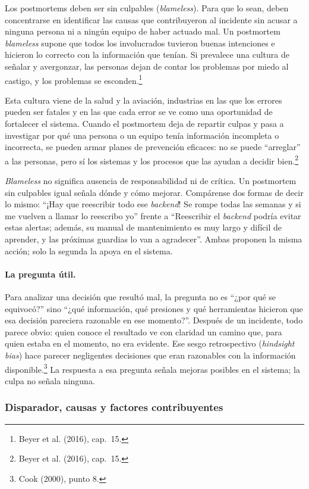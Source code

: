 \documentclass[variant=apuntes,cover=institutional,mode=screen]{ua-engineering-v6-article}
\begin{document}
Los postmortems deben ser sin culpables (\emph{blameless}). Para que lo sean, deben concentrarse en identificar las causas que contribuyeron al incidente sin acusar a ninguna persona ni a ningún equipo de haber actuado mal. Un postmortem \emph{blameless} supone que todos los involucrados tuvieron buenas intenciones e hicieron lo correcto con la información que tenían. Si prevalece una cultura de señalar y avergonzar, las personas dejan de contar los problemas por miedo al castigo, y los problemas se esconden.\footnote{Beyer et al. (2016), cap.~15.}

Esta cultura viene de la salud y la aviación, industrias en las que los errores pueden ser fatales y en las que cada error se ve como una oportunidad de fortalecer el sistema. Cuando el postmortem deja de repartir culpas y pasa a investigar por qué una persona o un equipo tenía información incompleta o incorrecta, se pueden armar planes de prevención eficaces: no se puede ``arreglar'' a las personas, pero sí los sistemas y los procesos que las ayudan a decidir bien.\footnote{Beyer et al. (2016), cap.~15.}

\emph{Blameless} no significa ausencia de responsabilidad ni de crítica. Un postmortem sin culpables igual señala dónde y cómo mejorar. Compárense dos formas de decir lo mismo: ``¡Hay que reescribir todo ese \emph{backend}! Se rompe todas las semanas y si me vuelven a llamar lo reescribo yo'' frente a ``Reescribir el \emph{backend} podría evitar estas alertas; además, su manual de mantenimiento es muy largo y difícil de aprender, y las próximas guardias lo van a agradecer''. Ambas proponen la misma acción; solo la segunda la apoya en el sistema.

\paragraph{La pregunta útil.} Para analizar una decisión que resultó mal, la pregunta no es ``¿por qué se equivocó?'' sino ``¿qué información, qué presiones y qué herramientas hicieron que esa decisión pareciera razonable en ese momento?''. Después de un incidente, todo parece obvio: quien conoce el resultado ve con claridad un camino que, para quien estaba en el momento, no era evidente. Ese sesgo retrospectivo (\emph{hindsight bias}) hace parecer negligentes decisiones que eran razonables con la información disponible.\footnote{Cook (2000), punto 8.} La respuesta a esa pregunta señala mejoras posibles en el sistema; la culpa no señala ninguna.

\subsubsection{Disparador, causas y factores contribuyentes}
\end{document}

